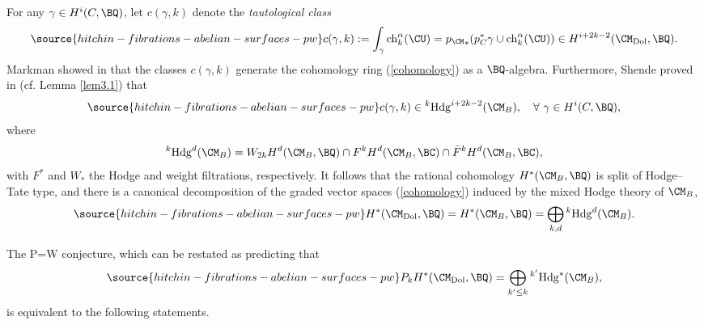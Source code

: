 

For any $\gamma \in H^i(C, \BQ)$, let $c(\gamma ,k)$ denote the \emph{tautological class}
\begin{equation}\label{taut_class}
\source{hitchin-fibrations-abelian-surfaces-pw}
c(\gamma ,k) := \int_\gamma \mathrm{ch}_k^\alpha(\CU) = {p_{\CM}}_\ast( p_C^\ast \gamma \cup \mathrm{ch}^\alpha_k(\CU)) \in H^{i+2k-2}(\CM_{\mathrm{Dol}}, \BQ).
\end{equation}
Markman showed in \cite{Markman} that the classes $c(\gamma,k)$ generate the cohomology ring (\ref{cohomology}) as a $\BQ$-algebra. Furthermore, Shende proved in \cite{Shende} { (cf. Lemma \ref{lem3.1})}  that
\begin{equation}\label{taut_weight}
\source{hitchin-fibrations-abelian-surfaces-pw}
    c(\gamma,k) \in {^k\mathrm{Hdg}^{i+2k-2}(\CM_B)},\quad \forall~\gamma \in H^i(C, \BQ),
\end{equation}
where
\[
^k\mathrm{Hdg}^d(\CM_B) =  W_{2k}H^d(\CM_B, \BQ) \cap F^k H^d(\CM_B, \BC) \cap \bar{F}^k H^d(\CM_B, \BC),
\]
with $F^*$ and $W_*$ the Hodge  and weight filtrations, respectively. It follows that  the rational cohomology  $H^*(\CM_B, \BQ)$ is split  of Hodge--Tate type, and there is a canonical decomposition of
the graded vector spaces (\ref{cohomology}) induced by the mixed  Hodge theory of $\CM_B$,
\begin{equation}\label{weight_decomp}
\source{hitchin-fibrations-abelian-surfaces-pw}
H^\ast(\CM_{\mathrm{Dol}}, \BQ) = H^\ast(\CM_B, \BQ) = \bigoplus_{k,d}  {^k\mathrm{Hdg}^d(\CM_B)}.
\end{equation}


The P=W conjecture,
which can be restated as predicting that
\begin{equation}\label{p=w-explicit}
\source{hitchin-fibrations-abelian-surfaces-pw}
P_k H^\ast(\CM_{\mathrm{Dol}}, \BQ) = \bigoplus_{k' \leq k}  {^{k'}\mathrm{Hdg}^*(\CM_B)},
\end{equation}
 is equivalent to the following statements.

